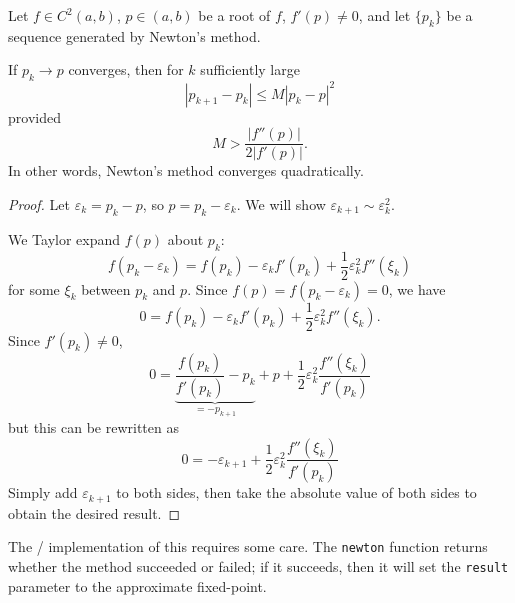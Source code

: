 \begin{thm}
Let $f\in C^{2}(a,b)$, $p\in(a,b)$ be a root of $f$, $f'(p)\neq0$, and
let $\{p_{k}\}$ be a sequence generated by Newton's method.

If $p_{k}\to p$ converges, then for $k$ sufficiently large
\begin{equation}
  |p_{k+1}-p_{k}|\leq M|p_{k}-p|^{2}
\end{equation}
provided
\begin{equation}
  M > \frac{|f''(p)|}{2|f'(p)|}.
\end{equation}
In other words, Newton's method converges quadratically.
\end{thm}
\begin{proof}
Let $\varepsilon_{k}=p_{k}-p$, so $p=p_{k}-\varepsilon_{k}$. We will
show $\varepsilon_{k+1}\sim\varepsilon_{k}^{2}$.

We Taylor expand $f(p)$ about $p_{k}$:
\begin{equation}
  f(p_{k}-\varepsilon_{k}) = f(p_{k}) - \varepsilon_{k}f'(p_{k}) + \frac{1}{2}\varepsilon_{k}^{2}f''(\xi_{k})
\end{equation}
for some $\xi_{k}$ between $p_{k}$ and $p$. Since $f(p)=f(p_{k}-\varepsilon_{k})=0$,
we have
\begin{equation}
  0 = f(p_{k}) - \varepsilon_{k}f'(p_{k}) + \frac{1}{2}\varepsilon_{k}^{2}f''(\xi_{k}).
\end{equation}
Since $f'(p_{k})\neq0$,
\begin{equation}
  0 = \underbrace{\frac{f(p_{k})}{f'(p_{k})}-p_{k}}_{=-p_{k+1}} + p +
  \frac{1}{2}\varepsilon_{k}^{2}\frac{f''(\xi_{k})}{f'(p_{k})}
\end{equation}
but this can be rewritten as
\begin{equation}
  0 = -\varepsilon_{k+1}
  +\frac{1}{2}\varepsilon_{k}^{2}\frac{f''(\xi_{k})}{f'(p_{k})}
\end{equation}
Simply add $\varepsilon_{k+1}$ to both sides, then take the absolute
value of both sides to obtain the desired result.
\end{proof}


\begin{chunk}
  The \FORTRAN/ implementation of this requires some care. The
  \verb#newton# function returns whether the method succeeded or
  failed; if it succeeds, then it will set the \verb#result# parameter
  to the approximate fixed-point.
  
\end{chunk}
